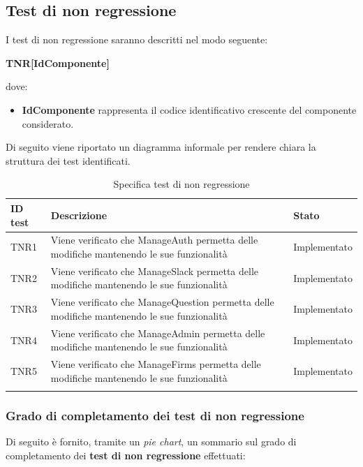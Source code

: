 \documentclass[../PianoDiQualifica_v4.0.0.tex]{subfiles}
\begin{document}
	\subsection{Test di non regressione}
	I test di non regressione saranno descritti nel modo seguente:
	\begin{center}
		\textbf{TNR[IdComponente]}
	\end{center}
	dove:
	\begin{itemize}
		\item \textbf{IdComponente} rappresenta il codice identificativo crescente del componente considerato.
	\end{itemize}
	Di seguito viene riportato un diagramma informale per rendere chiara la struttura dei test identificati.
	\\
	\begin{longtable}[c] { >{\centering\arraybackslash}p{4cm} p{7cm} >{\centering\arraybackslash}p{4cm}}
		\toprule
		\centerline{\textbf{ID test}} & \centerline{\textbf{Descrizione}} & \centerline{\textbf{Stato}} \\
			\midrule
			TNR1 & Viene verificato che ManageAuth permetta delle modifiche mantenendo le sue funzionalità & Implementato \\
			\addlinespace[0.3em]
			\midrule
			\addlinespace[0.3em]
			TNR2 & Viene verificato che ManageSlack permetta delle modifiche mantenendo le sue funzionalità & Implementato \\
			\addlinespace[0.3em]
			\midrule
			\addlinespace[0.3em]
			TNR3 & Viene verificato che ManageQuestion permetta delle modifiche mantenendo le sue funzionalità & Implementato \\
			\addlinespace[0.3em]
			\midrule
			\addlinespace[0.3em]
			TNR4 & Viene verificato che ManageAdmin permetta delle modifiche mantenendo le sue funzionalità & Implementato \\
			\addlinespace[0.3em]
			\midrule
			\addlinespace[0.3em]
			TNR5 & Viene verificato che ManageFirms permetta delle modifiche mantenendo le sue funzionalità & Implementato \\
			\bottomrule
			\caption{Specifica test di non regressione}
	\end{longtable}

	\newpage
	\subsubsection{Grado di completamento dei test di non regressione}

		Di seguito è fornito, tramite un \textit{pie chart}, un sommario sul grado di completamento dei \textbf{test di non regressione} effettuati:
\end{document}
